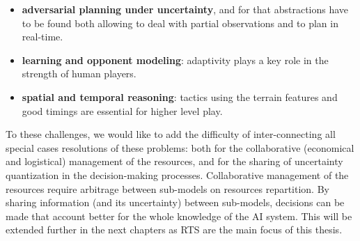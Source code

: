 

\begin{itemize}
    \item \textbf{adversarial planning under uncertainty}, and for that abstractions have to be found both allowing to deal with partial observations and to plan in real-time.
    \item \textbf{learning and opponent modeling}: adaptivity plays a key role in the strength of human players.
    \item \textbf{spatial and temporal reasoning}: tactics using the terrain features and good timings are essential for higher level play.
\end{itemize}
To these challenges, we would like to add the difficulty of inter-connecting all special cases resolutions of these problems: both for the collaborative (economical and logistical) management of the resources, and for the sharing of uncertainty quantization in the decision-making processes. Collaborative management of the resources require arbitrage between sub-models on resources repartition. By sharing information (and its uncertainty) between sub-models, decisions can be made that account better for the whole knowledge of the AI system. This will be extended further in the next chapters as RTS are the main focus of this thesis.

